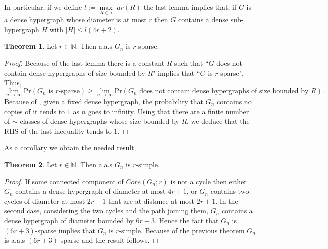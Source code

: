 \documentclass[12pt,notitlepage,a4paper]{article}
\theoremstyle{definition}
\newtheorem{theorem}{Theorem}[section]
\newcommand{\N}{\mathbb{N}}
\newcommand{\Ln}{\lim\limits_{n\to \infty}}
\newcommand{\sep}{\noindent\rule{2cm}{0.4pt}}
\begin{document}
In particular, if we define $l:=\max\limits_{R\in \sigma} \,\, ar(R)$
the last lemma implies that, if $G$ is a dense hypergraph whose
diameter is at most $r$ then $G$ contains a dense sub-hypergraph
$H$ with $|H|\leq l  (4r+2)$.\par


\begin{theorem} \label{thm:sparse}
	Let $r\in \N$. Then a.a.s $G_n$ is $r$-sparse. 
\end{theorem}
\begin{proof}
	Because of the last lemma there is a constant $R$ such that 
	``$G$ does not contain dense hypergraphs of size bounded by $R$" implies
	that ``$G$ is $r$-sparse". Thus,
	\[ \Ln \mathrm{Pr}\left( G_n \text{ is } r \text{-sparse}  \right)
	\geq \Ln \mathrm{Pr} \left( G_n \text{ does not contain dense 
	hypergraphs of size bounded by } R\right).\] 
	Because of	, given a fixed dense hypergraph,
	the probability that $G_n$ contains no copies
	of it tends to $1$ as $n$ goes to infinity. Using that
	there are a finite number of $\sim$ classes of dense hypergraphs whose
	size bounded by	$R$, we deduce that the RHS of the last inequality tends to $1$. 
\end{proof}
As a corollary we obtain the needed result. 
\begin{theorem}\label{cor:simple}
	Let $r\in \N$. Then a.a.s $G_n$ is $r$-simple.
\end{theorem}
\begin{proof}
	If some connected component of $Core(G_n;r)$ is not a cycle then either $G_n$ contains a dense hypergraph of diameter at most $4r+1$,
	or $G_n$ contains two cycles of diameter at most $2r+1$ that are at
	distance at most $2r+1$. In the second case, considering the two cycles
	and the path joining them, $G_n$ contains a dense hypergraph of diameter
	bounded by $6r+3$. Hence the fact that $G_n$ is $(6r+3)$-sparse
	implies that $G_n$ is $r$-simple. Because of the previous theorem 
	$G_n$ is a.a.s $(6r+3)$-sparse and the result follows. 
\end{proof}
\end{document}
